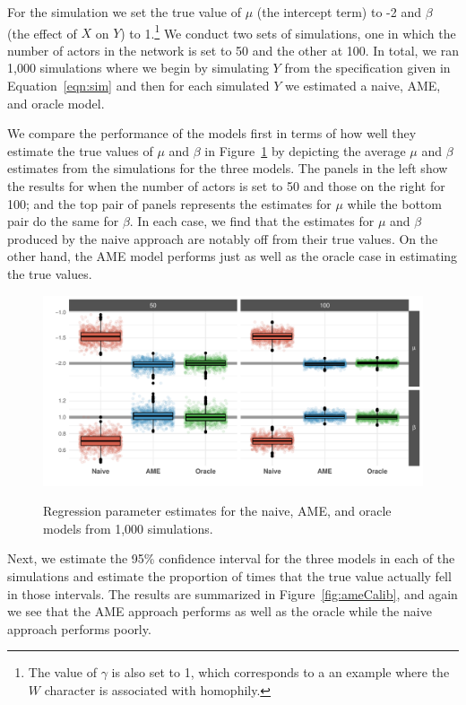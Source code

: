 For the simulation we set the true value of $\mu$ (the intercept term) to -2 and $\beta$ (the effect of $X$ on $Y$) to 1.\footnote{The value of $\gamma$ is also set to 1, which corresponds to a an example where the $W$ character is associated with homophily.} We conduct two sets of simulations, one in which the number of actors in the network is set to 50 and the other at 100. In total, we ran 1,000 simulations where we begin by simulating $Y$ from the specification given in Equation~\ref{eqn:sim} and then for each simulated $Y$ we estimated a naive, AME, and oracle model. 

We compare the performance of the models first in terms of how well they estimate the true values of $\mu$ and $\beta$ in Figure~\ref{fig:ameBias} by depicting the average $\mu$ and $\beta$ estimates from the simulations for the three models. The panels in the left show the results for when the number of actors is set to 50 and those on the right for 100; and the top pair of panels represents the estimates for $\mu$ while the bottom pair do the same for $\beta$. In each case, we find that the estimates for $\mu$ and $\beta$ produced by the naive approach are notably off from their true values. On the other hand, the AME model performs just as well as the oracle case in estimating the true values. 

\begin{figure}
	\centering
	\caption{Regression parameter estimates for the naive, AME, and oracle models from 1,000 simulations.}
	\label{fig:ameBias}
	\includegraphics[width=1\textwidth]{ameSimBias_all.pdf} \\
\end{figure}

Next, we estimate the 95\% confidence interval for the three models in each of the simulations and estimate the proportion of times that the true value actually fell in those intervals. The results are summarized in Figure~\ref{fig:ameCalib}, and again we see that the AME approach performs as well as the oracle while the naive approach performs poorly. 

